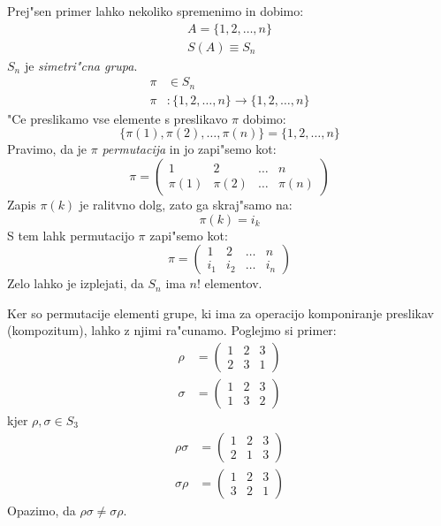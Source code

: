 Prej"sen primer lahko nekoliko spremenimo in dobimo:
\begin{gather*}
A = \{1, 2, \ldots, n\} \\
S(A) \equiv S_n
\end{gather*}
$S_n$ je \emph{simetri"cna grupa}.
\begin{align*}
\pi &\in S_n \\
\pi &: \{1, 2, \ldots, n\} \rightarrow \{1, 2, \ldots, n\}
\end{align*}
"Ce preslikamo vse elemente s preslikavo $\pi$ dobimo:
\begin{equation*}
\{\pi(1), \pi(2), \ldots, \pi(n)\} = \{1, 2, \ldots, n\}
\end{equation*}
Pravimo, da je $\pi$ \emph{permutacija} in jo zapi"semo kot:
\begin{equation*}
\pi = \begin{pmatrix}
1 & 2 & \ldots & n \\
\pi(1) & \pi(2) & \ldots & \pi(n)
\end{pmatrix}
\end{equation*}
Zapis $\pi(k)$ je ralitvno dolg, zato ga skraj"samo na:
\begin{equation*}
\pi(k) = i_k
\end{equation*}
S tem lahk permutacijo $\pi$ zapi"semo kot:
\begin{equation*}
\pi = \begin{pmatrix}
1 & 2 & \ldots & n \\
i_1 & i_2 & \ldots & i_n
\end{pmatrix}
\end{equation*}
Zelo lahko je izplejati, da $S_n$ ima $n!$ elementov.

Ker so permutacije elementi grupe, ki ima za operacijo komponiranje preslikav (kompozitum), lahko z njimi ra"cunamo. Poglejmo si primer:
\begin{align*}
\rho &= \begin{pmatrix}
1 & 2 & 3 \\
2 & 3 & 1
\end{pmatrix}\\
%
\sigma &= \begin{pmatrix}
1 & 2 & 3 \\
1 & 3 & 2
\end{pmatrix}
\end{align*}
kjer $\rho, \sigma \in S_3$
\begin{align*}
\rho \sigma &= \begin{pmatrix}
1 & 2 & 3 \\
2 & 1 & 3
\end{pmatrix}\\
%
\sigma \rho &= \begin{pmatrix}
1 & 2 & 3 \\
3 & 2 & 1
\end{pmatrix}
\end{align*}
Opazimo, da $\rho \sigma \neq \sigma \rho$.

